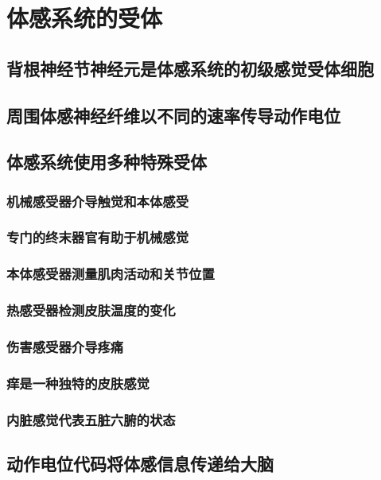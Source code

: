 \chapter{体感系统的受体}

\section{背根神经节神经元是体感系统的初级感觉受体细胞}

\section{周围体感神经纤维以不同的速率传导动作电位}

\section{体感系统使用多种特殊受体}
\subsection{机械感受器介导触觉和本体感受}
\subsection{专门的终末器官有助于机械感觉}
\subsection{本体感受器测量肌肉活动和关节位置}
\subsection{热感受器检测皮肤温度的变化}
\subsection{伤害感受器介导疼痛}
\subsection{痒是一种独特的皮肤感觉}
\subsection{内脏感觉代表五脏六腑的状态}

\section{动作电位代码将体感信息传递给大脑}
